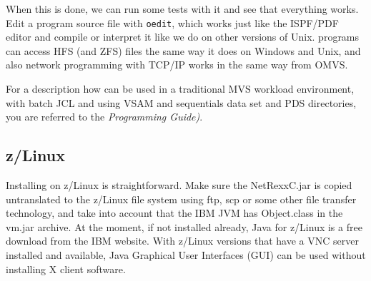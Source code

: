 When this is done, we can run some tests with it and see that
everything works. Edit a program source file with \texttt{oedit},
which works just like the ISPF/PDF editor and compile or interpret it
like we do on other versions of Unix. \nr programs can access HFS (and
ZFS) files the same way it does on Windows and Unix, and also network
programming with TCP/IP works in the same way from OMVS.

For a description how \nr can be used in a traditional MVS
workload environment, with batch JCL and using VSAM and sequentials
data set and PDS directories, you are referred to the \emph{\nr{}
  Programming Guide)}.
\subsection{z/Linux}
Installing on z/Linux is straightforward. Make sure the NetRexxC.jar
is copied untranslated to the z/Linux file system using ftp, scp or
some other file transfer technology, and take into
account that the IBM JVM has Object.class in the vm.jar archive. At
the moment, if not installed already, Java for z/Linux is a free download from the IBM website. With
z/Linux versions that have a VNC server installed and available, Java
Graphical User Interfaces (GUI) can be used without installing X client software. 